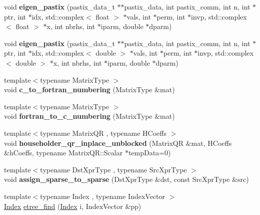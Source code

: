 \begin{DoxyCompactItemize}
void {\bfseries eigen\+\_\+pastix} (pastix\+\_\+data\+\_\+t $\ast$$\ast$pastix\+\_\+data, int pastix\+\_\+comm, int n, int $\ast$ptr, int $\ast$idx, std\+::complex$<$ float $>$ $\ast$vals, int $\ast$perm, int $\ast$invp, std\+::complex$<$ float $>$ $\ast$x, int nbrhs, int $\ast$iparm, double $\ast$dparm)
\item 
\mbox{\label{namespace_eigen_1_1internal_af1213cdace90c207c4b0345024f82bcb}} 
void {\bfseries eigen\+\_\+pastix} (pastix\+\_\+data\+\_\+t $\ast$$\ast$pastix\+\_\+data, int pastix\+\_\+comm, int n, int $\ast$ptr, int $\ast$idx, std\+::complex$<$ double $>$ $\ast$vals, int $\ast$perm, int $\ast$invp, std\+::complex$<$ double $>$ $\ast$x, int nbrhs, int $\ast$iparm, double $\ast$dparm)
\item 
\mbox{\label{namespace_eigen_1_1internal_a3b77815ecf2fc57f2aedb98843ee27ca}} 
{\footnotesize template$<$typename Matrix\+Type $>$ }\\void {\bfseries c\+\_\+to\+\_\+fortran\+\_\+numbering} (Matrix\+Type \&mat)
\item 
\mbox{\label{namespace_eigen_1_1internal_a2a586e53557a05a89df27c10a7e0e90c}} 
{\footnotesize template$<$typename Matrix\+Type $>$ }\\void {\bfseries fortran\+\_\+to\+\_\+c\+\_\+numbering} (Matrix\+Type \&mat)
\item 
\mbox{\label{namespace_eigen_1_1internal_a36c7a4dd089c5a50a1d4f4a89c4e9d18}} 
{\footnotesize template$<$typename Matrix\+QR , typename H\+Coeffs $>$ }\\void {\bfseries householder\+\_\+qr\+\_\+inplace\+\_\+unblocked} (Matrix\+QR \&mat, H\+Coeffs \&h\+Coeffs, typename Matrix\+Q\+R\+::\+Scalar $\ast$temp\+Data=0)
\item 
\mbox{\label{namespace_eigen_1_1internal_a822aa9eab9dafbe3fce2dd75b410bc40}} 
{\footnotesize template$<$typename Dst\+Xpr\+Type , typename Src\+Xpr\+Type $>$ }\\void {\bfseries assign\+\_\+sparse\+\_\+to\+\_\+sparse} (Dst\+Xpr\+Type \&dst, const Src\+Xpr\+Type \&src)
\item 
{\footnotesize template$<$typename Index , typename Index\+Vector $>$ }\\\hyperlink{namespace_eigen_a62e77e0933482dafde8fe197d9a2cfde}{Index} \hyperlink{namespace_eigen_1_1internal_af1daa938f6414254cc9a754f1ef2490b}{etree\+\_\+find} (\hyperlink{namespace_eigen_a62e77e0933482dafde8fe197d9a2cfde}{Index} i, Index\+Vector \&pp)

\end{DoxyCompactItemize}
